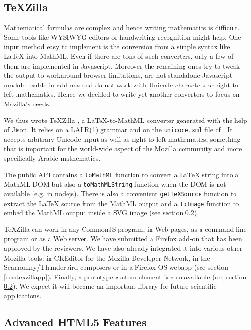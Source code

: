 \subsection{TeXZilla}
\label{sec:texzilla}

Mathematical formulas are complex and hence writing mathematics is difficult.
Some tools like WYSIWYG editors or handwriting recognition might help. One
input method easy to implement is the conversion from a simple syntax like
LaTeX into MathML. Even if there are tons of such converters, only a few of
them are implemented in Javascript. Moreover
the remaining ones try to tweak the output
to workaround browser limitations, are not standalone Javascript module usable
in add-ons and do not work with Unicode characters or right-to-left
mathematics. Hence we decided to write yet another converters to focus on
Mozilla's needs.

We thus wrote TeXZilla \cite{TeXZilla},
a LaTeX-to-MathML converter generated with the help of
\href{http://zaach.github.io/jison/docs/}{Jison}.
It relies on a LALR(1) grammar and on the {\tt unicode.xml} file of
\cite{XMLEntityDefinition}. It accepts arbitrary
Unicode input as well as right-to-left mathematics, something that is important
for the world-wide aspect of the Mozilla community and more specifically
Arabic mathematics.

The public API contains a {\tt toMathML} function to convert a LaTeX string
into a MathML DOM but also a {\tt toMathMLString} function when the DOM is
not available (e.g. in nodejs). There is also a convenient {\tt getTeXSource}
function to extract the LaTeX source from the MathML output and a
{\tt toImage} function to embed the MathML output inside a SVG image
(see section \ref{sec:advanced}).

TeXZilla can work in any CommonJS program, in Web pages, as a command line
program or as a Web server. We have submitted a \href{https://addons.mozilla.org/en-US/firefox/addon/texzilla/}{Firefox add-on}
that has been approved by the reviewers. We have also already integrated it into
various other Mozilla tools: in CKEditor for the Mozilla Developer Network,
in the Seamonkey/Thunderbird composers or in a Firefox OS webapp
(see section \ref{sec:texzillapp}).
Finally, a prototype {\tt <x-tex>} custom element is also available
(see section \ref{sec:advanced}).
We expect it will become an important library for future scientific
applications.

\subsection{Advanced HTML5 Features}
\label{sec:advanced}

